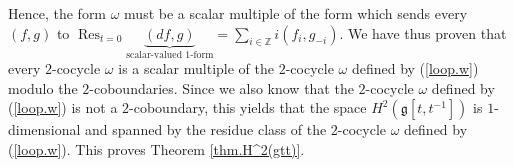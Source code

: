 \documentclass[etingof-lie.tex]{subfiles}
\begin{document}
Hence, the form $\omega$ must be a scalar multiple of the form which sends
every $\left(  f,g\right)  $ to $\operatorname*{Res}\nolimits_{t=0}%
\underbrace{\left(  df,g\right)  }_{\text{scalar-valued }1\text{-form}}%
=\sum\limits_{i\in\mathbb{Z}}i\left(  f_{i},g_{-i}\right)  $. We have thus
proven that every $2$-cocycle $\omega$ is a scalar multiple of the $2$-cocycle
$\omega$ defined by (\ref{loop.w}) modulo the $2$-coboundaries. Since we also
know that the $2$-cocycle $\omega$ defined by (\ref{loop.w}) is not a
$2$-coboundary, this yields that the space $H^{2}\left(  \mathfrak{g}\left[
t,t^{-1}\right]  \right)  $ is $1$-dimensional and spanned by the residue
class of the $2$-cocycle $\omega$ defined by (\ref{loop.w}). This proves
Theorem \ref{thm.H^2(gtt)}.
\end{document}
